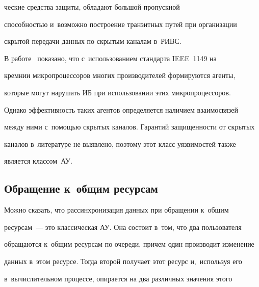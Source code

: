 \pagebreak





\noindent


ческие средства защиты, обладают большой пропускной 


способностью и~возможно построение транзитных путей при организации 


скрытой передачи данных по скрытым каналам в~РИВС. 


  


  В работе~\cite{3-g2} показано, что с~использованием стандарта IEEE~1149 на 


кремнии микропроцессоров многих производителей формируются агенты, 


которые могут нарушать ИБ при использовании этих микропроцессоров. 


Однако эффективность таких агентов определяется наличием взаимосвязей 


между ними с~помощью скрытых каналов. Гарантий защищенности от скрытых 


каналов в~литературе не выявлено, поэтому этот класс уязвимостей также 


является классом~АУ.





\vspace*{-4pt}


  


\subsection{Обращение к~общим ресурсам }





\vspace*{-2pt}





  Можно сказать, что рассинхронизация данных при обращении к~общим 


ресурсам~--- это классическая АУ. Она состоит в~том, что два пользователя 


обращаются к~общим ресурсам по очереди, причем один производит изменение 


данных в~этом ресурсе. Тогда второй получает этот ресурс и,~используя его 


в~вычислительном процессе, опирается на два различных значения этого 


